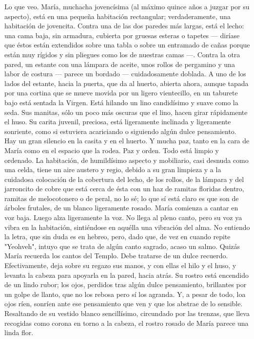 \documentclass[12pt]{book} %
\begin{document}
Lo que veo. María, muchacha jovencísima (al máximo quince años a juzgar por su aspecto), está en una pequeña 
habitación rectangular; verdaderamente, una habitación de jovencita. Contra una de las dos paredes más largas, está el lecho: una cama baja, sin armadura, cubierta por gruesas esteras o tapetes — diríase que éstos están extendidos sobre una tabla o sobre un entramado de cañas porque están muy rígidos y sin pliegues como los de nuestras camas —. Contra la otra pared, un estante con una lámpara de aceite, unos rollos de pergamino y una labor de costura — parece un bordado — cuidadosamente doblada. 
A uno de los lados del estante, hacia la puerta, que da al huerto, abierta ahora, aunque tapada por una cortina que se mueve movida por un ligero vientecillo, en un taburete bajo está sentada la Virgen. Está hilando un lino candidísimo y suave como la seda. Sus manitas, sólo un poco más oscuras que el lino, hacen girar rápidamente el huso. Su carita juvenil, preciosa, está ligeramente inclinada y ligeramente sonriente, como si estuviera acariciando o siguiendo algún dulce pensamiento. 
Hay un gran silencio en la casita y en el huerto. Y mucha paz, tanto en la cara de María como en el espacio que la rodea. Paz y orden. Todo está limpio y ordenado. La habitación, de humildísimo aspecto y mobiliario, casi desnuda como una celda, tiene un aire austero y regio, debido a su gran limpieza y a la cuidadosa colocación de la cobertura del lecho, de los rollos, de la lámpara y del jarroncito de cobre que está cerca de ésta con un haz de ramitas floridas dentro, ramitas de melocotonero o de peral, no lo sé; lo que sí está claro es que son de árboles frutales, de un blanco ligeramente rosado. 
María comienza a cantar en voz baja. Luego alza ligeramente la voz. No llega al pleno canto, pero su voz ya vibra en la 
habitación, sintiéndose en aquélla una vibración del alma. No entiendo la letra, que sin duda es en hebreo, pero, dado que, de vez en cuando repite "Yeohveh", intuyo que se trata de algún canto sagrado, acaso un salmo. Quizás María recuerda los cantos del Templo. Debe tratarse de un dulce recuerdo. Efectivamente, deja sobre su regazo sus manos, y con ellas el hilo y el huso, y levanta la cabeza para apoyarla en la pared, hacia atrás. Su rostro está encendido de un lindo rubor; los ojos, perdidos tras algún dulce pensamiento, brillantes por un golpe de llanto, que no los rebosa pero sí los agranda. Y, a pesar de todo, loa ojos ríen, sonríen ante ese pensamiento que ven y que los abstrae de lo sensible. Resaltando de su vestido blanco sencillísimo, circundado por las trenzas, que lleva recogidas como corona en torno a la cabeza, el rostro rosado de María parece una linda flor. 
\end{document}
